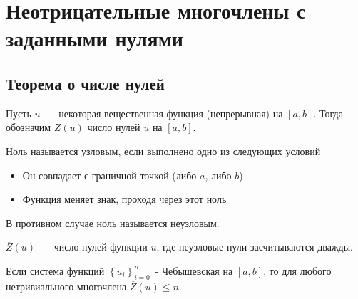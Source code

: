 \section{Неотрицательные многочлены с заданными нулями}
\subsection{Теорема о числе нулей}
\begin{dfn}
Пусть $u$ — некоторая вещественная функция (непрерывная) на $[a,b]$.
Тогда обозначим $Z(u)$ число нулей $u$ на $[a,b]$.
\end{dfn}

\begin{dfn}
Ноль называется узловым, если выполнено одно из следующих условий
\begin{itemize}
\item Он совпадает с граничной точкой (либо $a$, либо $b$)
\item Функция меняет знак, проходя через этот ноль
\end{itemize}
В противном случае ноль называется неузловым.
\end{dfn}

\begin{dfn}
$\overline{Z}(u)$ — число нулей функции $u$, где неузловые нули засчитываются дважды.
\end{dfn}

\begin{thm}
\label{zeroThm}
Если система функций $\left\{ u_i\right\}_{i=0}^{n}$ - Чебышевская на $[a,b]$,  то для любого нетривиального многочлена $\overline{Z}(u) \leq n$.
\end{thm}

